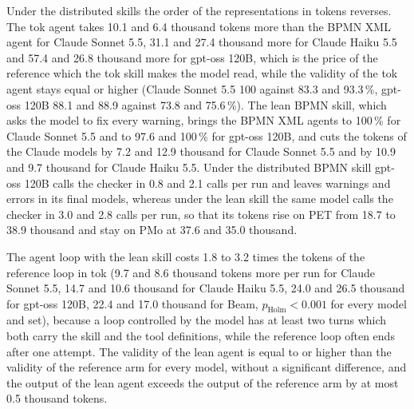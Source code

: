 \documentclass[11pt,a4paper]{article}
\begin{document}
Under the distributed skills the order of the representations in tokens reverses. The tok agent takes 10.1 and 6.4 thousand tokens more than the BPMN XML agent for Claude Sonnet 5.5, 31.1 and 27.4 thousand more for Claude Haiku 5.5 and 57.4 and 26.8 thousand more for gpt-oss 120B, which is the price of the reference which the tok skill makes the model read, while the validity of the tok agent stays equal or higher (Claude Sonnet 5.5 100 against 83.3 and 93.3\,\%, gpt-oss 120B 88.1 and 88.9 against 73.8 and 75.6\,\%). The lean BPMN skill, which asks the model to fix every warning, brings the BPMN XML agents to 100\,\% for Claude Sonnet 5.5 and to 97.6 and 100\,\% for gpt-oss 120B, and cuts the tokens of the Claude models by 7.2 and 12.9 thousand for Claude Sonnet 5.5 and by 10.9 and 9.7 thousand for Claude Haiku 5.5. Under the distributed BPMN skill gpt-oss 120B calls the checker in 0.8 and 2.1 calls per run and leaves warnings and errors in its final models, whereas under the lean skill the same model calls the checker in 3.0 and 2.8 calls per run, so that its tokens rise on PET from 18.7 to 38.9 thousand and stay on PMo at 37.6 and 35.0 thousand.

The agent loop with the lean skill costs 1.8 to 3.2 times the tokens of the reference loop in tok (9.7 and 8.6 thousand tokens more per run for Claude Sonnet 5.5, 14.7 and 10.6 thousand for Claude Haiku 5.5, 24.0 and 26.5 thousand for gpt-oss 120B, 22.4 and 17.0 thousand for Beam, $p_\text{Holm}<0.001$ for every model and set), because a loop controlled by the model has at least two turns which both carry the skill and the tool definitions, while the reference loop often ends after one attempt. The validity of the lean agent is equal to or higher than the validity of the reference arm for every model, without a significant difference, and the output of the lean agent exceeds the output of the reference arm by at most 0.5 thousand tokens.
\end{document}

